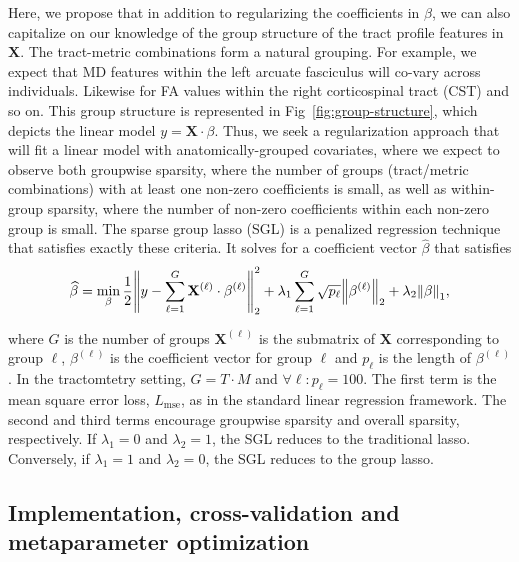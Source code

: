 Here, we propose that in addition to regularizing the coefficients in $\beta$,
we can also capitalize on our knowledge of the group structure of the tract
profile features in $\mathbf{X}$. The tract-metric combinations form a natural
grouping. For example, we expect that MD features within the left arcuate
fasciculus will co-vary across individuals. Likewise for FA values within the
right corticospinal tract (CST) and so on. This group structure is represented
in Fig~\ref{fig:group-structure}, which depicts the linear model $y = \mathbf{X}
\cdot \beta$. Thus, we seek a regularization approach that will fit a linear
model with anatomically-grouped covariates, where we expect to observe both
groupwise sparsity, where the number of groups (tract/metric combinations) with
at least one non-zero coefficients is small, as well as within-group sparsity,
where the number of non-zero coefficients within each non-zero group is small.
The sparse group lasso (SGL)
is a penalized regression technique that satisfies exactly these
criteria\cite{simon2013sparse}. It solves for a coefficient vector
$\widehat{\beta}$ that satisfies
\begin{equation}
    \widehat{\beta} = \min_\beta \frac{1}{2}
    \norm*{y - \displaystyle \sum_{\ell = 1}^{G}
    \mathbf{X}^{(\ell)} \cdot \beta^{(\ell)}}_2^2
    + \lambda_1 \displaystyle \sum_{\ell = 1}^{G}
    \sqrt{p_\ell} \norm*{\beta^{(\ell)}}_2
    + \lambda_2 \norm*{\beta}_1,
    \label{eq:sgl}
\end{equation}

where $G$ is the number of groups $\mathbf{X}^{(\ell)}$ is the submatrix
of $\mathbf{X}$ corresponding to group $\ell$, $\beta^{(\ell)}$ is
the coefficient vector for group $\ell$ and $p_\ell$ is the length of
$\beta^{(\ell)}$. In the tractomtetry setting, $G = T \cdot M$ and
$\forall \ell: p_\ell = 100$. The first term is the mean square error
loss, $L_{\text{mse}}$, as in the standard linear regression framework.
The second and third terms encourage groupwise sparsity and overall
sparsity, respectively. If $\lambda_1 = 0$ and $\lambda_2 = 1$, the
SGL reduces to the traditional lasso\cite{tibshirani1996regression}.
Conversely, if $\lambda_1 = 1$ and $\lambda_2 = 0$, the SGL reduces to
the group lasso\cite{yuan2006model}.

\subsection*{Implementation, cross-validation and metaparameter optimization}

